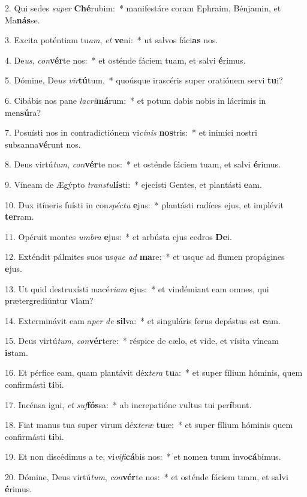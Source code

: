 2. Qui sedes \textit{su}\textit{per} \textbf{Ché}rubim:~*  manifestáre coram Ephraim, Bénjamin, et Ma\textbf{nás}se.\

3. Excita poténtiam tu\textit{am}, \textit{et} \textbf{ve}ni:~*  ut salvos fáci\textbf{as} nos.\

4. De\textit{us}, \textit{con}\textbf{vér}te nos:~*  et osténde fáciem tuam, et salvi \textbf{é}rimus.\

5. Dómine, De\textit{us} \textit{vir}\textbf{tú}tum,~*  quoúsque irascéris super oratiónem servi \textbf{tu}i?\

6. Cibábis nos pane \textit{la}\textit{cri}\textbf{má}rum:~*  et potum dabis nobis in lácrimis in men\textbf{sú}ra?\

7. Posuísti nos in contradictiónem vi\textit{cí}\textit{nis} \textbf{nos}tris:~*  et inimíci nostri subsanna\textbf{vé}runt nos.\

8. Deus virtú\textit{tum}, \textit{con}\textbf{vér}te nos:~*  et osténde fáciem tuam, et salvi \textbf{é}rimus.\

9. Víneam de Ægýpto \textit{trans}\textit{tu}\textbf{lís}ti:~*  ejecísti Gentes, et plantásti \textbf{e}am.\

10. Dux itíneris fuísti in con\textit{spéc}\textit{tu} \textbf{e}jus:~*  plantásti radíces ejus, et implévit \textbf{ter}ram.\

11. Opéruit montes \textit{um}\textit{bra} \textbf{e}jus:~*  et arbústa ejus cedros \textbf{De}i.\

12. Exténdit pálmites suos us\textit{que} \textit{ad} \textbf{ma}re:~*  et usque ad flumen propágines \textbf{e}jus.\

13. Ut quid destruxísti macé\textit{ri}\textit{am} \textbf{e}jus:~*  et vindémiant eam omnes, qui prætergrediúntur \textbf{vi}am?\

14. Exterminávit eam a\textit{per} \textit{de} \textbf{sil}va:~*  et singuláris ferus depástus est \textbf{e}am.\

15. Deus virtú\textit{tum}, \textit{con}\textbf{vér}tere:~*  réspice de cælo, et vide, et vísita víneam \textbf{is}tam.\

16. Et pérfice eam, quam plantávit déx\textit{te}\textit{ra} \textbf{tu}a:~*  et super fílium hóminis, quem confirmásti \textbf{ti}bi.\

17. Incénsa igni, \textit{et} \textit{suf}\textbf{fós}sa:~*  ab increpatióne vultus tui per\textbf{í}bunt.\

18. Fiat manus tua super virum déx\textit{te}\textit{ræ} \textbf{tu}æ:~*  et super fílium hóminis quem confirmásti \textbf{ti}bi.\

19. Et non discédimus a te, vi\textit{vi}\textit{fi}\textbf{cá}bis nos:~*  et nomen tuum invo\textbf{cá}bimus.\

20. Dómine, Deus virtú\textit{tum}, \textit{con}\textbf{vér}te nos:~*  et osténde fáciem tuam, et salvi \textbf{é}rimus.\

